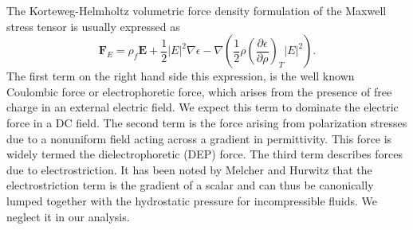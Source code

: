 \documentclass[12pt,a4paper,oneside]{book}
\begin{document}
The Korteweg-Helmholtz volumetric force density formulation of the Maxwell stress tensor is usually expressed as\cite{melcher_continuum_????}
\begin{equation}\label{force_density}
\mathbf{F}_E = \rho_f \mathbf{E} + \frac{1}{2} \left| E \right|^2 \nabla \epsilon - \nabla \left( \frac{1}{2} \rho \left( \frac{\partial \epsilon}{\partial \rho} \right)_T \left| E \right|^2 \right) .
\end{equation}
The first term on the right hand side this expression, is the well known Coulombic force or electrophoretic force, which arises from the presence of free charge in an external electric field. We expect this term to dominate the electric force in a DC field. The second term is the force arising from polarization stresses due to a nonuniform field acting across a gradient in permittivity. This force is widely termed the dielectrophoretic (DEP) force. The third term describes forces due to electrostriction. It has been noted by Melcher and Hurwitz that the electrostriction term is the gradient of a scalar and can thus be canonically lumped together with the hydrostatic pressure for incompressible fluids\cite{hurwitz_electrohydrodynamic_1966}. We neglect it in our analysis. 
\end{document}
